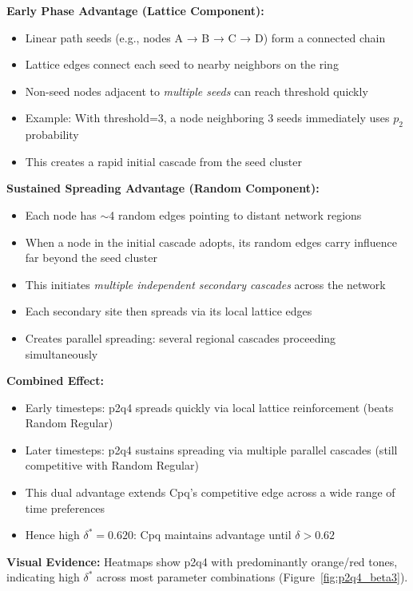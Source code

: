 \documentclass[12pt,a4paper]{article}
\begin{document}
\textbf{Early Phase Advantage (Lattice Component):}
\begin{itemize}
    \item Linear path seeds (e.g., nodes A → B → C → D) form a connected chain
    \item Lattice edges connect each seed to nearby neighbors on the ring
    \item Non-seed nodes adjacent to \textit{multiple seeds} can reach threshold quickly
    \item Example: With threshold=3, a node neighboring 3 seeds immediately uses $p_2$ probability
    \item This creates a rapid initial cascade from the seed cluster
\end{itemize}

\textbf{Sustained Spreading Advantage (Random Component):}
\begin{itemize}
    \item Each node has $\sim$4 random edges pointing to distant network regions
    \item When a node in the initial cascade adopts, its random edges carry influence far beyond the seed cluster
    \item This initiates \textit{multiple independent secondary cascades} across the network
    \item Each secondary site then spreads via its local lattice edges
    \item Creates parallel spreading: several regional cascades proceeding simultaneously
\end{itemize}

\textbf{Combined Effect:}
\begin{itemize}
    \item Early timesteps: p2q4 spreads quickly via local lattice reinforcement (beats Random Regular)
    \item Later timesteps: p2q4 sustains spreading via multiple parallel cascades (still competitive with Random Regular)
    \item This dual advantage extends Cpq's competitive edge across a wide range of time preferences
    \item Hence high $\delta^* = 0.620$: Cpq maintains advantage until $\delta > 0.62$
\end{itemize}

\textbf{Visual Evidence:} Heatmaps show p2q4 with predominantly orange/red tones, indicating high $\delta^*$ across most parameter combinations (Figure~\ref{fig:p2q4_beta3}).
\end{document}
